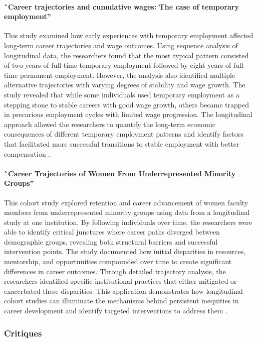 \documentclass[../main.tex]{subfiles}
\begin{document}
\paragraph{\``Career trajectories and cumulative wages: The case of temporary employment''}
This study examined how early experiences with temporary employment affected long-term career trajectories and wage outcomes. Using sequence analysis of longitudinal data, the researchers found that the most typical pattern consisted of two years of full-time temporary employment followed by eight years of full-time permanent employment. However, the analysis also identified multiple alternative trajectories with varying degrees of stability and wage growth. The study revealed that while some individuals used temporary employment as a stepping stone to stable careers with good wage growth, others became trapped in precarious employment cycles with limited wage progression. The longitudinal approach allowed the researchers to quantify the long-term economic consequences of different temporary employment patterns and identify factors that facilitated more successful transitions to stable employment with better compensation \cite{manzoni2014career}.

\paragraph{\``Career Trajectories of Women From Underrepresented Minority Groups''}
This cohort study explored retention and career advancement of women faculty members from underrepresented minority groups using data from a longitudinal study at one institution. By following individuals over time, the researchers were able to identify critical junctures where career paths diverged between demographic groups, revealing both structural barriers and successful intervention points. The study documented how initial disparities in resources, mentorship, and opportunities compounded over time to create significant differences in career outcomes. Through detailed trajectory analysis, the researchers identified specific institutional practices that either mitigated or exacerbated these disparities. This application demonstrates how longitudinal cohort studies can illuminate the mechanisms behind persistent inequities in career development and identify targeted interventions to address them \cite{rios2021career}.

\subsubsection{Critiques}
\end{document}
